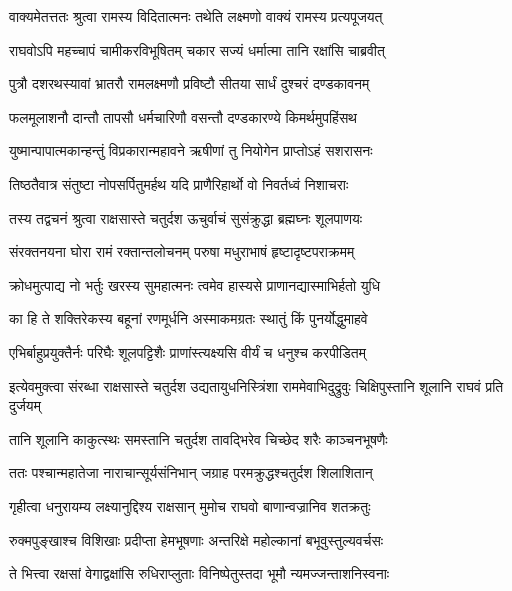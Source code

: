 \twolineshloka
{वाक्यमेतत्ततः श्रुत्वा रामस्य विदितात्मनः}
{तथेति लक्ष्मणो वाक्यं रामस्य प्रत्यपूजयत्} %

\twolineshloka
{राघवोऽपि महच्चापं चामीकरविभूषितम्}
{चकार सज्यं धर्मात्मा तानि रक्षांसि चाब्रवीत्} %

\twolineshloka
{पुत्रौ दशरथस्यावां भ्रातरौ रामलक्ष्मणौ}
{प्रविष्टौ सीतया सार्धं दुश्चरं दण्डकावनम्} %

\twolineshloka
{फलमूलाशनौ दान्तौ तापसौ धर्मचारिणौ}
{वसन्तौ दण्डकारण्ये किमर्थमुपहिंसथ} %

\twolineshloka
{युष्मान्पापात्मकान्हन्तुं विप्रकारान्महावने}
{ऋषीणां तु नियोगेन प्राप्तोऽहं सशरासनः} %

\twolineshloka
{तिष्ठतैवात्र संतुष्टा नोपसर्पितुमर्हथ}
{यदि प्राणैरिहार्थो वो निवर्तध्वं निशाचराः} %

\twolineshloka
{तस्य तद्वचनं श्रुत्वा राक्षसास्ते चतुर्दश}
{ऊचुर्वाचं सुसंक्रुद्धा ब्रह्मघ्नः शूलपाणयः} %

\twolineshloka
{संरक्तनयना घोरा रामं रक्तान्तलोचनम्}
{परुषा मधुराभाषं हृष्टादृष्टपराक्रमम्} %

\twolineshloka
{क्रोधमुत्पाद्य नो भर्तुः खरस्य सुमहात्मनः}
{त्वमेव हास्यसे प्राणानद्यास्माभिर्हतो युधि} %

\twolineshloka
{का हि ते शक्तिरेकस्य बहूनां रणमूर्धनि}
{अस्माकमग्रतः स्थातुं किं पुनर्योद्धुमाहवे} %

\twolineshloka
{एभिर्बाहुप्रयुक्तैर्नः परिघैः शूलपट्टिशैः}
{प्राणांस्त्यक्ष्यसि वीर्यं च धनुश्च करपीडितम्} %

\threelineshloka
{इत्येवमुक्त्वा संरब्धा राक्षसास्ते चतुर्दश}
{उद्यतायुधनिस्त्रिंशा राममेवाभिदुद्रुवुः}
{चिक्षिपुस्तानि शूलानि राघवं प्रति दुर्जयम्} %

\twolineshloka
{तानि शूलानि काकुत्स्थः समस्तानि चतुर्दश}
{तावद्भिरेव चिच्छेद शरैः काञ्चनभूषणैः} %

\twolineshloka
{ततः पश्चान्महातेजा नाराचान्सूर्यसंनिभान्}
{जग्राह परमक्रुद्धश्चतुर्दश शिलाशितान्} %

\twolineshloka
{गृहीत्वा धनुरायम्य लक्ष्यानुद्दिश्य राक्षसान्}
{मुमोच राघवो बाणान्वज्रानिव शतक्रतुः} %

\twolineshloka
{रुक्मपुङ्खाश्च विशिखाः प्रदीप्ता हेमभूषणाः}
{अन्तरिक्षे महोल्कानां बभूवुस्तुल्यवर्चसः} %

\twolineshloka
{ते भित्त्वा रक्षसां वेगाद्वक्षांसि रुधिराप्लुताः}
{विनिष्पेतुस्तदा भूमौ न्यमज्जन्ताशनिस्वनाः} %

